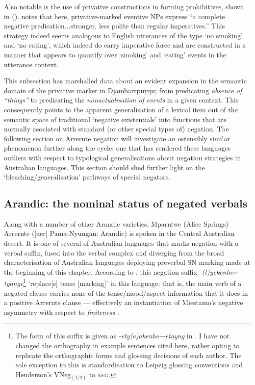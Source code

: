Also notable is the use of privative constructions in forming prohibitives, shown in (). \citet[446]{Wilkinson1991} notes that here, privative-marked eventive NPs express ``a complete negative predication...stronger, less polite than regular imperatives.'' This strategy indeed seems analogous to English utterances of the type `no smoking' and `no eating', which indeed do carry imperative force and are constructed in a manner that appears to quantify over `smoking' and `eating' events in the utterance context.

This subsection has marshalled data about an evident expansion in the semantic domain of the privative marker in Djambarrpuyŋu; from predicating\textit{ absence of ``things''} to predicating the \textit{nonactualisation of }\textit{events} in a given context. This consequently points to the apparent generalisation of a lexical item out of the semantic space of traditional `negative existentials' into functions that are normally asociated with standard (or other special types of) negation. The following section on Arrernte negation will investigate an ostensibly similar phenomenon further along the cycle; one that has rendered these languages outliers with respect to typological generalisations about negation strategies in Australian languages. This section should shed further light on the `bleaching/generalisation' pathways of special negators.


\subsection{Arandic: the nominal status of negated verbals}\label{ar}



Along with a number of other Arandic varieties, Mparntwe (Alice Springs) Arrernte ([\gls{aer}] Pama-Nyungan: Arandic) is spoken in the Central Australian desert. It is one of several of Australian languages that marks negation with a verbal suffix, fused into the verbal complex and diverging from the broad characterisation of Australian languages deploying preverbal SN marking made at the beginning of this chapter.  According to \citet[71]{Wilkins1989}, this negation suffix \textit{-(t)yekenhe\textasciitilde-tyange}\footnote{The form of this suffix is given as \textit{-ety(e)\textdblhyphen akenhe\textasciitilde-etayng} in \citealt{Henderson2013}. I have not changed the orthography in example sentences cited here, rather opting to replicate the orthographic forms and glossing decisions of each author. The sole exception to this is standardisation to Leipzig glossing conventions and Henderson's VNeg$_{(1/2)} $ to \textsc{neg}.} `replace[s] tense [marking]' in this language; that is, the main verb of a negated clause carries none of the tense/mood/aspect information that it does in a positive Arrernte clause --- effectively an instantiation of Miestamo's negative asymmetry with respect to \textit{finiteness} \citeyearpar[\texttt{A/Fin}][73ff]{Miestamo2005}.

